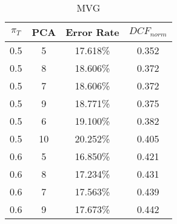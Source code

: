 \begin{center}
\begin{longtable}{|c|c|c|c|}
\caption{MVG}\label{tab:mvg_acctable}\\
\hline
$\pi_T$ & PCA & Error Rate & $DCF_{norm}$\\
\hline
0.5 & 5 & 17.618\% & 0.352\\
\hline
0.5 & 8 & 18.606\% & 0.372\\
\hline
0.5 & 7 & 18.606\% & 0.372\\
\hline
0.5 & 9 & 18.771\% & 0.375\\
\hline
0.5 & 6 & 19.100\% & 0.382\\
\hline
0.5 & 10 & 20.252\% & 0.405\\
\hline
0.6 & 5 & 16.850\% & 0.421\\
\hline
0.6 & 8 & 17.234\% & 0.431\\
\hline
0.6 & 7 & 17.563\% & 0.439\\
\hline
0.6 & 9 & 17.673\% & 0.442\\
\hline
\hline
\end{longtable}
\end{center}
